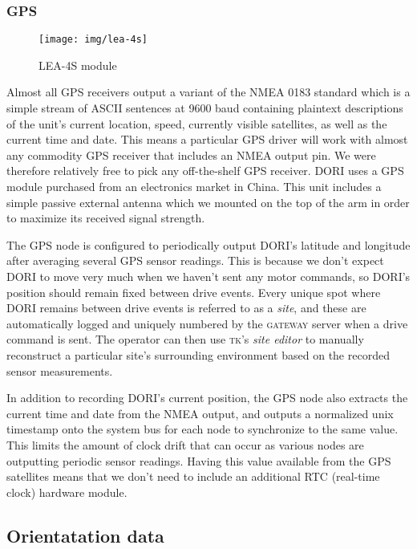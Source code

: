     \subsubsection*{GPS}
    \begin{wrapfigure}{l}{0.19\textwidth}
        \centering
        \texttt{[image: img/lea-4s]}
        \caption*{LEA-4S module}
    \end{wrapfigure}
    Almost all GPS receivers output a variant of the NMEA 0183 standard which is a simple stream of ASCII sentences at 9600 baud containing plaintext descriptions of the unit's current location, speed, currently visible satellites, as well as the current time and date. This means a particular GPS driver will work with almost any commodity GPS receiver that includes an NMEA output pin. We were therefore relatively free to pick any off-the-shelf GPS receiver. DORI uses a  GPS module purchased from an electronics market in China. This unit includes a simple passive external antenna which we mounted on the top of the arm in order to maximize its received signal strength.

    The GPS node is configured to periodically output DORI's latitude and longitude after averaging several GPS sensor readings. This is because we don't expect DORI to move very much when we haven't sent any motor commands, so DORI's position should remain fixed between drive events. Every unique spot where DORI remains between drive events is referred to as a \emph{site}, and these are automatically logged and uniquely numbered by the \textsc{gateway} server when a drive command is sent. The operator can then use \textsc{tk}'s \emph{site editor} to manually reconstruct a particular site's surrounding environment based on the recorded sensor measurements.

    In addition to recording DORI's current position, the GPS node also extracts the current time and date from the NMEA output, and outputs a normalized unix timestamp onto the system bus for each node to synchronize to the same value. This limits the amount of clock drift that can occur as various nodes are outputting periodic sensor readings. Having this value available from the GPS satellites means that we don't need to include an additional RTC (real-time clock) hardware module. 

\subsection{Orientatation data}

